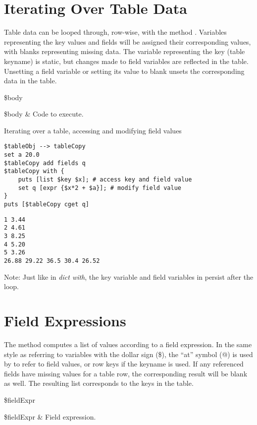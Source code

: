 \documentclass{article}
\begin{document}
\section{Iterating Over Table Data}
Table data can be looped through, row-wise, with the method . 
Variables representing the key values and fields will be assigned their corresponding values, with blanks representing missing data. 
The variable representing the key (table keyname) is static, but changes made to field variables are reflected in the table. 
Unsetting a field variable or setting its value to blank unsets the corresponding data in the table. 
\begin{syntax}
 \$body
\end{syntax}
\begin{args}
\$body & Code to execute.
\end{args}
\begin{example}{Iterating over a table, accessing and modifying field values}
\begin{lstlisting}
$tableObj --> tableCopy
set a 20.0
$tableCopy add fields q
$tableCopy with {
    puts [list $key $x]; # access key and field value
    set q [expr {$x*2 + $a}]; # modify field value
}
puts [$tableCopy cget q]
\end{lstlisting}
\tcblower
\begin{lstlisting}
1 3.44
2 4.61
3 8.25
4 5.20
5 3.26
26.88 29.22 36.5 30.4 26.52
\end{lstlisting}
\end{example}
Note: Just like in \textit{dict with}, the key variable and field variables in  persist after the loop.
\clearpage
\section{Field Expressions}
The method  computes a list of values according to a field expression. 
In the same style as referring to variables with the dollar sign (\$), the ``at'' symbol (@) is used by  to refer to field values, or row keys if the keyname is used. 
If any referenced fields have missing values for a table row, the corresponding result will be blank as well. 
The resulting list corresponds to the keys in the table.
\begin{syntax}
 \$fieldExpr
\end{syntax}
\begin{args}
\$fieldExpr & Field expression.
\end{args}
\end{document}
